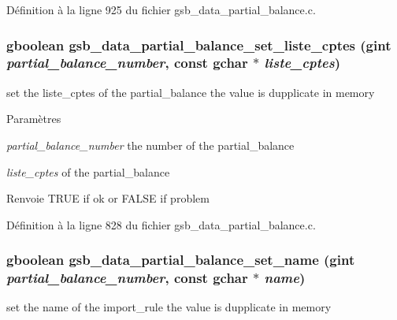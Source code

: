 Définition à la ligne 925 du fichier gsb\_\-data\_\-partial\_\-balance.c.

\subsubsection[{gsb\_\-data\_\-partial\_\-balance\_\-set\_\-liste\_\-cptes}]{\setlength{\rightskip}{0pt plus 5cm}gboolean gsb\_\-data\_\-partial\_\-balance\_\-set\_\-liste\_\-cptes (gint {\em partial\_\-balance\_\-number}, \/  const gchar $\ast$ {\em liste\_\-cptes})}\label{gsb__data__partial__balance_8h_a84f976f707046b30d436a82a94921441}
set the liste\_\-cptes of the partial\_\-balance the value is dupplicate in memory


\begin{DoxyParams}{Paramètres}
\item[{\em partial\_\-balance\_\-number}]the number of the partial\_\-balance \item[{\em liste\_\-cptes}]of the partial\_\-balance\end{DoxyParams}
\begin{DoxyReturn}{Renvoie}
TRUE if ok or FALSE if problem 
\end{DoxyReturn}


Définition à la ligne 828 du fichier gsb\_\-data\_\-partial\_\-balance.c.

\subsubsection[{gsb\_\-data\_\-partial\_\-balance\_\-set\_\-name}]{\setlength{\rightskip}{0pt plus 5cm}gboolean gsb\_\-data\_\-partial\_\-balance\_\-set\_\-name (gint {\em partial\_\-balance\_\-number}, \/  const gchar $\ast$ {\em name})}\label{gsb__data__partial__balance_8h_ae2945c54476e4bdd915ec04fd8d5d899}
set the name of the import\_\-rule the value is dupplicate in memory


